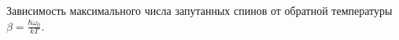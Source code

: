 Зависимость максимального числа запутанных спинов от обратной температуры
$\beta = \frac{\hbar\omega_0}{kT}$.

